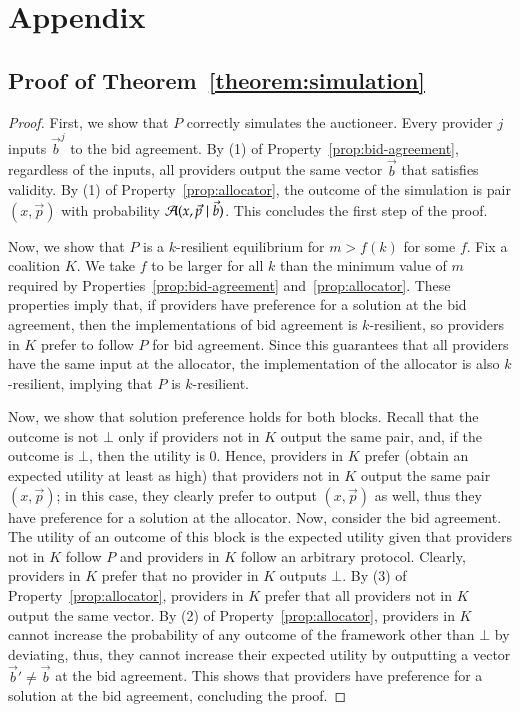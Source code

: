 

\section*{Appendix}

\subsection{Proof of Theorem~\ref{theorem:simulation}}
\label{app:simulation}

\begin{proof}
First, we show that $P$ correctly simulates the auctioneer.
Every provider $j$ inputs $\vec{b}^j$ to the bid agreement.
By (1) of Property~\ref{prop:bid-agreement}, regardless of the inputs,
all providers output the same vector $\vec{b}$
that satisfies validity. By (1) of Property~\ref{prop:allocator},
the outcome of the simulation is pair $(x,\vec{p})$
with probability $\mathcal{A}(x,\vec{p} \mid \vec{b})$.
This concludes the first step of the proof.

Now, we show that $P$ is a $k$-resilient equilibrium for $m > f(k)$ for some $f$.
Fix a coalition $K$. We take $f$ to be larger for all $k$ than the minimum value of $m$
required by Properties~\ref{prop:bid-agreement} and~\ref{prop:allocator}.
These properties imply that, if providers have preference for a solution
at the bid agreement, then the implementations of bid agreement is $k$-resilient,
so providers in $K$ prefer to follow $P$ for bid agreement.
Since this guarantees that all providers have the same input at the
allocator, the implementation of the allocator is also $k$-resilient,
implying that $P$ is $k$-resilient.

Now, we show that solution preference holds for both blocks.
Recall that the outcome is not $\bot$ only if
providers not in $K$ output the same pair,
and, if the outcome is $\bot$, then the utility is $0$.
Hence, providers in $K$ prefer (obtain an expected utility at least as high)
that providers not in $K$ output the same pair $(x,\vec{p})$;
in this case, they clearly prefer to output $(x,\vec{p})$ as well, thus they have preference
for a solution at the allocator. Now, consider the bid agreement.
The utility of an outcome of this block is the expected
utility given that providers not in $K$ follow $P$ and providers in $K$
follow an arbitrary protocol. Clearly, providers in $K$
prefer that no provider in $K$ outputs $\bot$.
By (3) of Property~\ref{prop:allocator}, providers in $K$
prefer that all providers not in $K$ output the same vector.
By (2) of Property~\ref{prop:allocator},
providers in $K$ cannot increase the probability of any outcome of the framework 
other than $\bot$ by deviating, thus, they cannot increase their expected utility by outputting
a vector $\vec{b}' \neq \vec{b}$ at the bid agreement.
This shows that providers have preference for a 
solution at the bid agreement, concluding the proof.
\end{proof}


